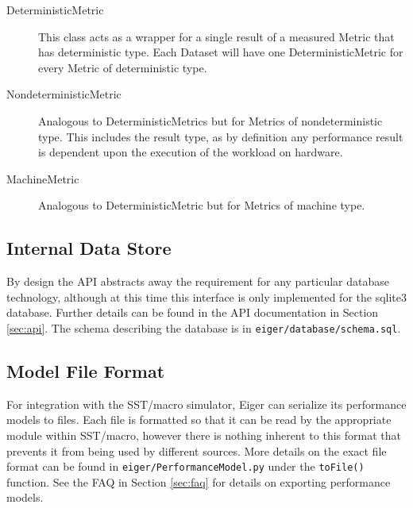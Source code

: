 \begin{description}
\item[DeterministicMetric] This class acts as a wrapper for a single result of a
measured Metric that has deterministic type. Each Dataset will have one
DeterministicMetric for every Metric of deterministic type.

\item[NondeterministicMetric] Analogous to DeterministicMetrics but for Metrics
of nondeterministic type. This includes the result type, as by definition
any performance result is dependent upon the execution of the workload on
hardware.

\item[MachineMetric] Analogous to DeterministicMetric but for Metrics of machine
type. 
\end{description}

\subsection{Internal Data Store}
By design the API abstracts away the requirement for any particular database
technology, although at this time this interface is only implemented for the
sqlite3 database. Further details can be found in the API documentation in
Section \ref{sec:api}. The schema describing the database is in
\texttt{eiger/database/schema.sql}. 

\subsection{Model File Format}
For integration with the SST/macro simulator, Eiger can serialize its
performance models to files. Each file is formatted so that it can be read
by the appropriate module within SST/macro, however there is nothing
inherent to this format that prevents it from being used by different
sources. More details on the exact file format can be found in
\texttt{eiger/PerformanceModel.py} under the \texttt{toFile()} function. 
See the FAQ in Section \ref{sec:faq}
for details on exporting performance models.
